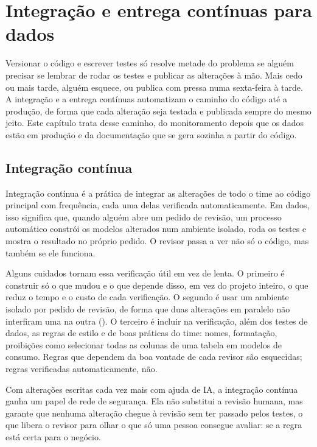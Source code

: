 \chapter{Integração e entrega contínuas para dados}
\label{cap:ci-cd}

Versionar o código e escrever testes só resolve metade do problema se alguém precisar se
lembrar de rodar os testes e publicar as alterações à mão. Mais cedo ou mais tarde, alguém
esquece, ou publica com pressa numa sexta-feira à tarde. A integração e a entrega contínuas
automatizam o caminho do código até a produção, de forma que cada alteração seja testada e
publicada sempre do mesmo jeito. Este capítulo trata desse caminho, do monitoramento depois
que os dados estão em produção e da documentação que se gera sozinha a partir do código.

\section{Integração contínua}
\label{sec:ci}

Integração contínua é a prática de integrar as alterações de todo o time ao código principal
com frequência, cada uma delas verificada automaticamente. Em dados, isso significa que,
quando alguém abre um pedido de revisão, um processo automático constrói os modelos alterados
num ambiente isolado, roda os testes e mostra o resultado no próprio pedido. O revisor passa a
ver não só o código, mas também se ele funciona.

Alguns cuidados tornam essa verificação útil em vez de lenta. O primeiro é construir só o que
mudou e o que depende disso, em vez do projeto inteiro, o que reduz o tempo e o custo de cada
verificação. O segundo é usar um ambiente isolado por pedido de revisão, de forma que duas
alterações em paralelo não interfiram uma na outra (). O terceiro é
incluir na verificação, além dos testes de dados, as regras de estilo e de boas práticas do
time: nomes, formatação, proibições como selecionar todas as colunas de uma tabela em modelos
de consumo. Regras que dependem da boa vontade de cada revisor são esquecidas; regras
verificadas automaticamente, não.

Com alterações escritas cada vez mais com ajuda de IA, a integração contínua ganha um papel de
rede de segurança. Ela não substitui a revisão humana, mas garante que nenhuma alteração chegue
à revisão sem ter passado pelos testes, o que libera o revisor para olhar o que só uma pessoa
consegue avaliar: se a regra está certa para o negócio.

